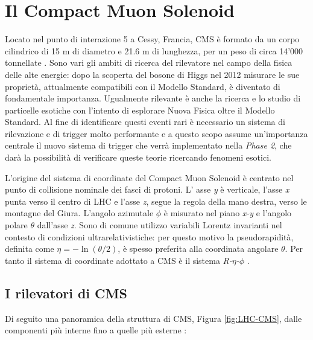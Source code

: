 \section{Il Compact Muon Solenoid}  
\label{sec:CMSDescrizione}

Locato nel punto di interazione 5 a Cessy, Francia, CMS è formato da un corpo cilindrico di 15 m di diametro e 21.6 m di lunghezza, per un peso di circa 14'000 tonnellate \cite{cms2008cms}. Sono vari gli ambiti di ricerca del rilevatore nel campo della fisica delle alte energie: dopo la scoperta del bosone di Higgs nel 2012 misurare le sue proprietà, attualmente compatibili con il Modello Standard, è diventato di fondamentale importanza. Ugualmente rilevante è anche la ricerca e lo studio di particelle esotiche con l'intento di esplorare Nuova Fisica oltre il Modello Standard. Al fine di identificare questi eventi rari è necessario un sistema di rilevazione e di trigger molto performante \cite{sirunyan2020performance} e a questo scopo assume un'importanza centrale il nuovo sistema di trigger che verrà implementato nella \textit{Phase 2}, che darà la possibilità di verificare queste teorie ricercando fenomeni esotici.

L'origine del sistema di coordinate del Compact Muon Solenoid è centrato nel punto di collisione nominale dei fasci di protoni. L' asse \textit{y} è verticale, l'asse \textit{x} punta verso il centro di LHC e l'asse \textit{z}, segue la regola della mano destra, verso le montagne del Giura. L'angolo azimutale $\phi$ è misurato nel piano \textit{x-y} e l'angolo polare $\theta$ dall'asse \textit{z}. Sono di comune utilizzo variabili Lorentz invarianti nel contesto di condizioni ultrarelativistiche: per questo motivo la pseudorapidità, definita come $\eta = -\ln\left(\theta/2\right)$, è spesso preferita alla coordinata angolare $\theta$. Per tanto il sistema di coordinate adottato a CMS è il sistema \textit{R-$\eta$-$\phi$} \cite{Quertenmont:2010ota}.

\subsection{I rilevatori di CMS}

Di seguito una panoramica della struttura di CMS, Figura \ref{fig:LHC-CMS}, dalle componenti più interne fino a quelle più esterne \cite{MasterThesisNicLai}:

